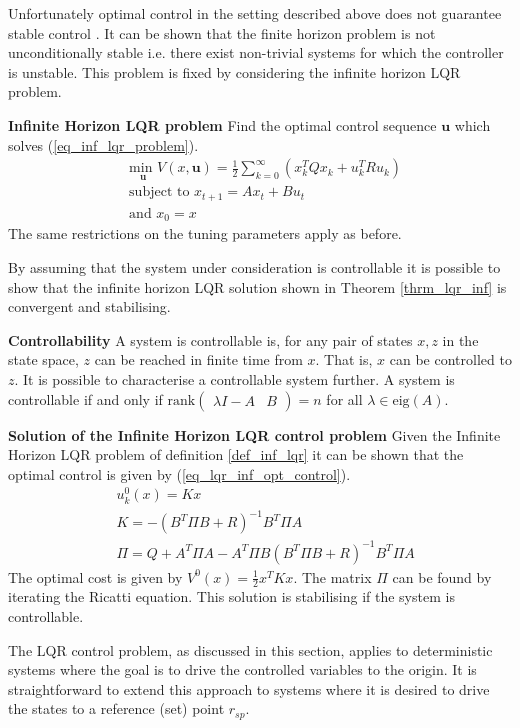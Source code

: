 \documentclass[../masters.tex]{subfiles}
\begin{document}
Unfortunately optimal control in the setting described above does not guarantee stable control \cite{raw}. It can be shown that the finite horizon problem is not unconditionally stable i.e. there exist non-trivial systems for which the controller is unstable. This problem is fixed by considering the infinite horizon LQR problem. 
\begin{defn}
\textbf{Infinite Horizon LQR problem} Find the optimal control sequence $\mathbf{u}$ which solves (\ref{eq_inf_lqr_problem}).
\begin{equation}
\begin{aligned}
&\underset{\mathbf{u}}{\text{min }} V(x, \mathbf{u}) = \frac{1}{2}\sum_{k=0}^{\infty} \left( x_k^TQx_k + u_k^TRu_k \right) \\
&\text{subject to } x_{t+1} = Ax_t+Bu_t \\
&\text{and } x_0 = x
\end{aligned}
\label{eq_inf_lqr_problem}
\end{equation}
The same restrictions on the tuning parameters apply as before.
\label{def_inf_lqr}
\end{defn}
By assuming that the system under consideration is controllable it is possible to show that the infinite horizon LQR solution shown in Theorem \ref{thrm_lqr_inf} is convergent and stabilising.
\begin{defn}
\textbf{Controllability} A system is controllable is, for any pair of states $x,z$ in the state space, $z$ can be reached in finite time from $x$. That is, $x$ can be controlled to $z$. It is possible to characterise a controllable system further. A system is controllable if and only if $\text{rank}\begin{pmatrix}
\lambda I- A & B
\end{pmatrix} = n$ for all $\lambda \in \text{eig}(A)$. 
\end{defn}
\begin{thrm}
\textbf{Solution of the Infinite Horizon LQR control problem} Given the Infinite Horizon LQR problem of definition \ref{def_inf_lqr} it can be shown that the optimal control is given by (\ref{eq_lqr_inf_opt_control}).
\begin{equation}
\begin{aligned}
&u^0_{k}(x) = Kx \\
&K = -(B^T\Pi B+R)^{-1}B^T\Pi A \\
&\Pi = Q + A^T\Pi A-A^T\Pi B(B^T\Pi B+R)^{-1}B^T\Pi A  
\end{aligned}
\label{eq_lqr_inf_opt_control}
\end{equation}
The optimal cost is given by $V^0(x) = \frac{1}{2}x^TKx$. The matrix $\Pi$ can be found by iterating the Ricatti equation. This solution is stabilising if the system is controllable.
\label{thrm_lqr_inf}
\end{thrm}
The LQR control problem, as discussed in this section, applies to deterministic systems where the goal is to drive the controlled variables to the origin. It is straightforward to extend this approach to systems where it is desired to drive the states to a reference (set) point $r_{sp}$.
\end{document}
